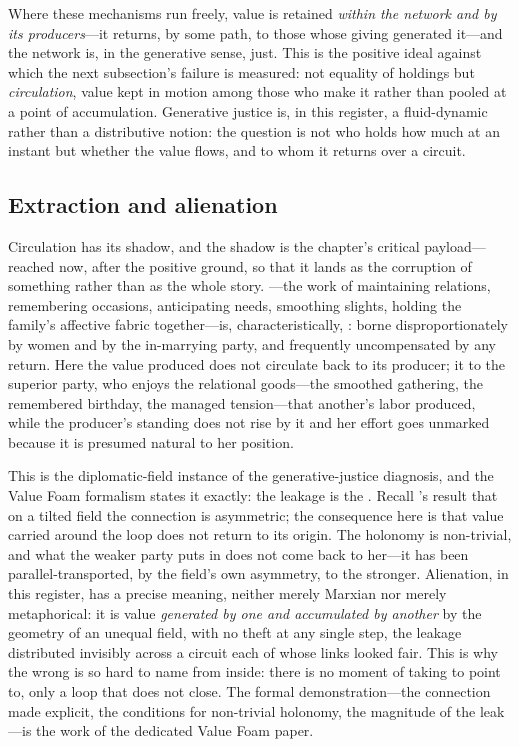 Where these mechanisms run freely, value is retained \emph{within the network and by its producers}---it returns, by some path, to those whose giving generated it---and the network is, in the generative sense, just. This is the positive ideal against which the next subsection's failure is measured: not equality of holdings but \emph{circulation}, value kept in motion among those who make it rather than pooled at a point of accumulation. Generative justice is, in this register, a fluid-dynamic rather than a distributive notion: the question is not who holds how much at an instant but whether the value flows, and to whom it returns over a circuit.

\subsection{Extraction and alienation}
Circulation has its shadow, and the shadow is the chapter's critical payload---reached now, after the positive ground, so that it lands as the corruption of something rather than as the whole story. ---the work of maintaining relations, remembering occasions, anticipating needs, smoothing slights, holding the family's affective fabric together---is, characteristically, : borne disproportionately by women and by the in-marrying party, and frequently uncompensated by any return. Here the value produced does not circulate back to its producer; it  to the superior party, who enjoys the relational goods---the smoothed gathering, the remembered birthday, the managed tension---that another's labor produced, while the producer's standing does not rise by it and her effort goes unmarked because it is presumed natural to her position.

This is the diplomatic-field instance of the generative-justice diagnosis, and the Value Foam formalism states it exactly: the leakage is the . Recall 's result that on a tilted field the connection is asymmetric; the consequence here is that value carried around the loop does not return to its origin. The holonomy is non-trivial, and what the weaker party puts in does not come back to her---it has been parallel-transported, by the field's own asymmetry, to the stronger. Alienation, in this register, has a precise meaning, neither merely Marxian nor merely metaphorical: it is value \emph{generated by one and accumulated by another} by the geometry of an unequal field, with no theft at any single step, the leakage distributed invisibly across a circuit each of whose links looked fair. This is why the wrong is so hard to name from inside: there is no moment of taking to point to, only a loop that does not close. The formal demonstration---the connection made explicit, the conditions for non-trivial holonomy, the magnitude of the leak---is the work of the dedicated Value Foam paper.


